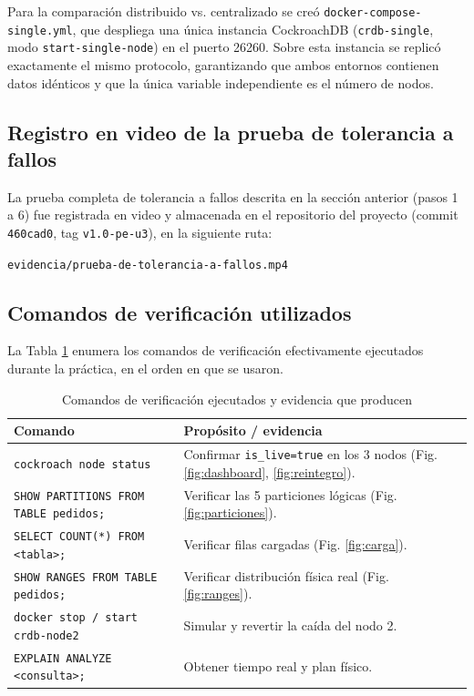 \documentclass[10pt,letterpaper]{article}
\begin{document}
Para la comparación distribuido vs. centralizado se creó \texttt{docker-compose-single.yml}, que despliega una única instancia CockroachDB (\texttt{crdb-single}, modo \texttt{start-single-node}) en el puerto 26260. Sobre esta instancia se replicó exactamente el mismo protocolo, garantizando que ambos entornos contienen datos idénticos y que la única variable independiente es el número de nodos.

\subsection{Registro en video de la prueba de tolerancia a fallos}
La prueba completa de tolerancia a fallos descrita en la sección anterior (pasos 1 a 6) fue registrada en video y almacenada en el repositorio del proyecto (commit \texttt{460cad0}, tag \texttt{v1.0-pe-u3}), en la siguiente ruta:
\begin{center}
\texttt{evidencia/prueba-de-tolerancia-a-fallos.mp4}
\end{center}

\subsection{Comandos de verificación utilizados}
La Tabla \ref{tab:comandos} enumera los comandos de verificación efectivamente ejecutados durante la práctica, en el orden en que se usaron.

\begin{table}[H]
\centering
\caption{Comandos de verificación ejecutados y evidencia que producen}
\label{tab:comandos}
\begin{tabularx}{\columnwidth}{p{3.6cm}X}
\toprule
\textbf{Comando} & \textbf{Propósito / evidencia}\\
\midrule
\texttt{cockroach node status} & Confirmar \texttt{is\_live=true} en los 3 nodos (Fig. \ref{fig:dashboard}, \ref{fig:reintegro}). \\
\texttt{SHOW PARTITIONS FROM TABLE pedidos;} & Verificar las 5 particiones lógicas (Fig. \ref{fig:particiones}). \\
\texttt{SELECT COUNT(*) FROM <tabla>;} & Verificar filas cargadas (Fig. \ref{fig:carga}). \\
\texttt{SHOW RANGES FROM TABLE pedidos;} & Verificar distribución física real (Fig. \ref{fig:ranges}). \\
\texttt{docker stop / start crdb-node2} & Simular y revertir la caída del nodo 2. \\
\texttt{EXPLAIN ANALYZE <consulta>;} & Obtener tiempo real y plan físico. \\
\bottomrule
\end{tabularx}
\end{table}
\end{document}
